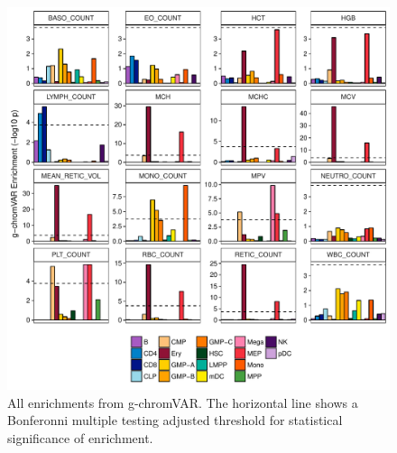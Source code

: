 \documentclass{article}\usepackage[]{graphicx}\usepackage[]{color}
\makeatletter
\def\maxwidth{ %
  \ifdim\Gin@nat@width>\linewidth
    \linewidth
  \else
    \Gin@nat@width
  \fi
}
\newenvironment{knitrout}{}{} %
\makeatother
\begin{document}
\begin{knitrout}
\color{fgcolor}\begin{figure}[H]

{\centering \includegraphics[width=\maxwidth]{figure/allGchromvar-1} 

}

\caption[All enrichments from g-chromVAR]{All enrichments from g-chromVAR. The horizontal line shows a Bonferonni multiple testing adjusted threshold for statistical significance of enrichment.}\label{fig:allGchromvar}
\end{figure}


\end{knitrout}
\end{document}
